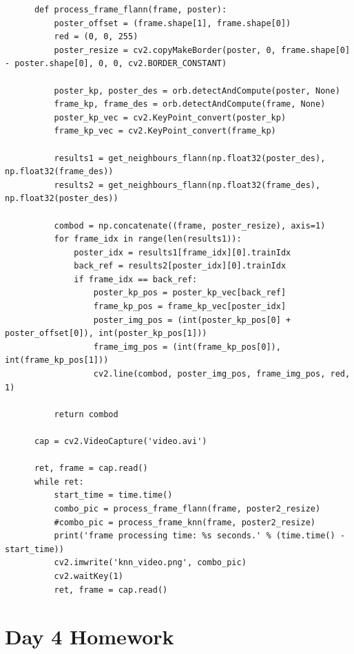 \documentclass{article}
\begin{document}
\begin{verbatim}
      def process_frame_flann(frame, poster):
          poster_offset = (frame.shape[1], frame.shape[0])
          red = (0, 0, 255)
          poster_resize = cv2.copyMakeBorder(poster, 0, frame.shape[0] - poster.shape[0], 0, 0, cv2.BORDER_CONSTANT)

          poster_kp, poster_des = orb.detectAndCompute(poster, None)
          frame_kp, frame_des = orb.detectAndCompute(frame, None)
          poster_kp_vec = cv2.KeyPoint_convert(poster_kp)
          frame_kp_vec = cv2.KeyPoint_convert(frame_kp)

          results1 = get_neighbours_flann(np.float32(poster_des), np.float32(frame_des))
          results2 = get_neighbours_flann(np.float32(frame_des), np.float32(poster_des))

          combod = np.concatenate((frame, poster_resize), axis=1)
          for frame_idx in range(len(results1)):
              poster_idx = results1[frame_idx][0].trainIdx
              back_ref = results2[poster_idx][0].trainIdx
              if frame_idx == back_ref:
                  poster_kp_pos = poster_kp_vec[back_ref]
                  frame_kp_pos = frame_kp_vec[poster_idx]
                  poster_img_pos = (int(poster_kp_pos[0] + poster_offset[0]), int(poster_kp_pos[1]))
                  frame_img_pos = (int(frame_kp_pos[0]), int(frame_kp_pos[1]))
                  cv2.line(combod, poster_img_pos, frame_img_pos, red, 1)

          return combod

      cap = cv2.VideoCapture('video.avi')

      ret, frame = cap.read()
      while ret:
          start_time = time.time()
          combo_pic = process_frame_flann(frame, poster2_resize)
          #combo_pic = process_frame_knn(frame, poster2_resize)
          print('frame processing time: %s seconds.' % (time.time() - start_time))
          cv2.imwrite('knn_video.png', combo_pic)
          cv2.waitKey(1)
          ret, frame = cap.read()
  \end{verbatim}


  \section{Day 4 Homework}
\end{document}
